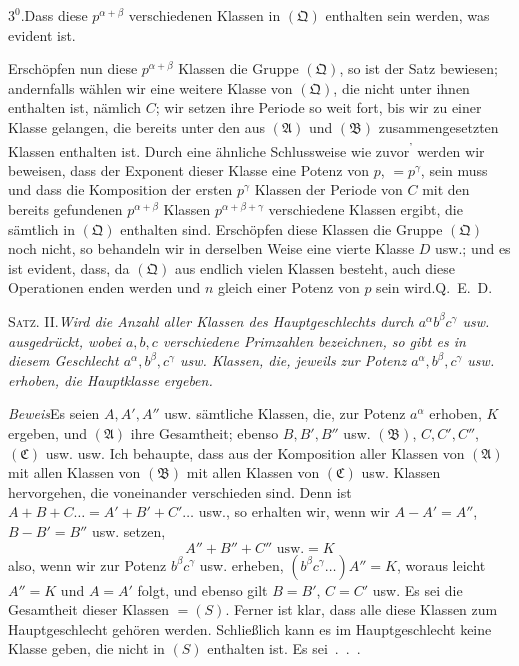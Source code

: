 $3^0$.\quad Dass diese $p^{\alpha+\beta}$ verschiedenen Klassen in $(\mathfrak Q)$ enthalten sein werden, was evident ist.

Erschöpfen nun diese $p^{\alpha+\beta}$ Klassen die Gruppe $(\mathfrak Q)$, so ist der Satz bewiesen; andernfalls wählen wir eine weitere Klasse von $(\mathfrak Q)$, die nicht unter ihnen enthalten ist, nämlich $C$; wir setzen ihre Periode so weit fort, bis wir zu einer Klasse gelangen, die bereits unter den aus $(\mathfrak A)$ und $(\mathfrak B)$ zusammengesetzten Klassen enthalten ist. Durch eine ähnliche Schlussweise wie zuvor\textsuperscript{'} werden wir beweisen, dass der Exponent dieser Klasse eine Potenz von $p$, $=p^\gamma$, sein muss und dass die Komposition der ersten $p^\gamma$ Klassen der Periode von $C$ mit den bereits gefundenen $p^{\alpha+\beta}$ Klassen $p^{\alpha+\beta+\gamma}$ verschiedene Klassen ergibt, die sämtlich in $(\mathfrak Q)$ enthalten sind. Erschöpfen diese Klassen die Gruppe $(\mathfrak Q)$ noch nicht, so behandeln wir in derselben Weise eine vierte Klasse $D$ usw.; und es ist evident, dass, da $(\mathfrak Q)$ aus endlich vielen Klassen besteht, auch diese Operationen enden werden und $n$ gleich einer Potenz von $p$ sein wird.\quad \mbox{Q. E. D.}

\par\bigskip
{}
\textsc{Satz. II.}\quad\emph{Wird die Anzahl aller Klassen des Hauptgeschlechts durch $a^\alpha b^\beta c^\gamma$ usw. ausgedrückt, wobei $a,b,c$ verschiedene Primzahlen bezeichnen, so gibt es in diesem Geschlecht $a^\alpha,b^\beta,c^\gamma$ usw. Klassen, die, jeweils zur Potenz $a^\alpha,b^\beta,c^\gamma$ usw. erhoben, die Hauptklasse ergeben.}

\emph{Beweis}\quad Es seien $A,A',A''$ usw. sämtliche Klassen, die, zur Potenz $a^\alpha$ erhoben, $K$ ergeben, und $(\mathfrak A)$ ihre Gesamtheit; ebenso $B,B',B''$ usw. $(\mathfrak B)$, $C,C',C''$, $(\mathfrak C)$ usw. usw. Ich behaupte, dass aus der Komposition aller Klassen von $(\mathfrak A)$ mit allen Klassen von $(\mathfrak B)$ mit allen Klassen von $(\mathfrak C)$ usw. Klassen hervorgehen, die voneinander verschieden sind. Denn ist $A+B+C\dots=A'+B'+C'\dots$ usw., so erhalten wir, wenn wir $A-A'=A''$, $B-B'=B''$ usw. setzen,
\[
A''+B''+C''\text{ usw.}=K
\]
also, wenn wir zur Potenz $b^\beta c^\gamma$ usw. erheben, $(b^\beta c^\gamma\dots)A''=K$, woraus leicht
$A''=K$ und $A=A'$ folgt, und ebenso gilt $B=B'$, $C=C'$ usw. Es sei die Gesamtheit dieser Klassen $=(S)$. Ferner ist klar, dass alle diese Klassen zum Hauptgeschlecht gehören werden. Schließlich kann es im Hauptgeschlecht keine Klasse geben, die nicht in $(S)$ enthalten ist. Es sei\ .\ .\ .

